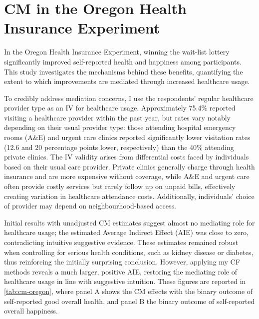 \section{CM in the Oregon Health Insurance Experiment}
\label{sec:oregon}
In the Oregon Health Insurance Experiment, winning the wait-list lottery significantly improved self-reported health and happiness among participants. 
This study investigates the mechanisms behind these benefits, quantifying the extent to which improvements are mediated through increased healthcare usage.

To credibly address mediation concerns, I use the respondents' regular healthcare provider type as an IV for healthcare usage.
Approximately 75.4\% reported visiting a healthcare provider within the past year, but rates vary notably depending on their usual provider type: those attending hospital emergency rooms (A\&E) and urgent care clinics reported significantly lower visitation rates (12.6 and 20 percentage points lower, respectively) than the 40\% attending private clinics.
The IV validity arises from differential costs faced by individuals based on their usual care provider.
Private clinics generally charge through health insurance and are more expensive without coverage, while A\&E and urgent care often provide costly services but rarely follow up on unpaid bills, effectively creating variation in healthcare attendance costs.
Additionally, individuals' choice of provider may depend on neighbourhood-based access.

Initial results with unadjusted CM estimates suggest almost no mediating role for healthcare usage; the estimated Average Indirect Effect (AIE) was close to zero, contradicting intuitive suggestive evidence.
These estimates remained robust when controlling for serious health conditions, such as kidney disease or diabetes, thus reinforcing the initially surprising conclusion.
However, applying my CF methods reveals a much larger, positive AIE, restoring the mediating role of healthcare usage in line with suggestive intuition.
These figures are reported in \autoref{tab:cm-oregon}, where panel A shows the CM effects with the binary outcome of self-reported good overall health, and panel B the binary outcome of self-reported overall happiness.

